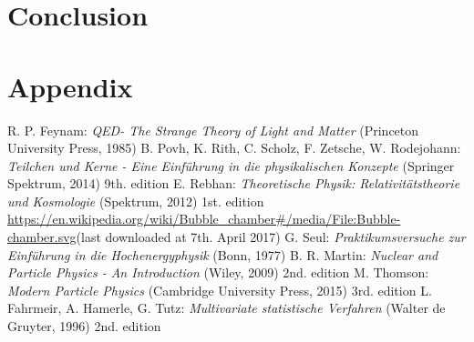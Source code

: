 \documentclass[10pt, a4paper, notitlepage, DIV=15]{scrartcl}
\begin{document}
\section{Conclusion}

\section{Appendix}

\begin{thebibliography}{}
	R. P. Feynam: \textit{QED- The Strange Theory of Light and Matter} (Princeton University Press, 1985)
	B. Povh, K. Rith, C. Scholz, F. Zetsche, W. Rodejohann: \textit{Teilchen und Kerne - Eine Einführung in die physikalischen Konzepte} (Springer Spektrum, 2014) 9th. edition
	E. Rebhan: \textit{Theoretische Physik: Relativitätstheorie und Kosmologie} (Spektrum, 2012) 1st. edition
	\url{https://en.wikipedia.org/wiki/Bubble_chamber#/media/File:Bubble-chamber.svg}\newline (last downloaded at 7th. April 2017)
	G. Seul: \textit{Praktikumsversuche zur Einführung in die Hochenergyphysik} (Bonn, 1977)
	B. R. Martin: \textit{Nuclear and Particle Physics - An Introduction} (Wiley, 2009) 2nd. edition
	M. Thomson: \textit{Modern Particle Physics} (Cambridge University Press, 2015) 3rd. edition
	L. Fahrmeir, A. Hamerle, G. Tutz: \textit{Multivariate statistische Verfahren} (Walter de Gruyter, 1996) 2nd. edition
\end{thebibliography}
 
\end{document}
